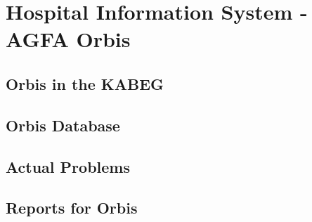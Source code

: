 \documentclass[a4paper]{article}
\begin{document}
	\newpage
	
	\section{Hospital Information System - AGFA Orbis}
	\subsection{Orbis in the KABEG}
	\subsection{Orbis Database}
	\subsection{Actual Problems}
	\subsection{Reports for Orbis}
	
\end{document}
